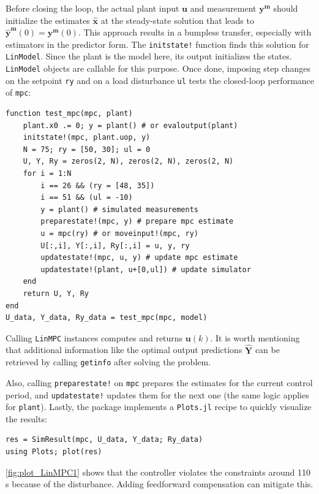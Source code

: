 Before closing the loop, the actual plant input $\mathbf{u}$ and measurement $\mathbf{y^m}$ should initialize the estimates $\mathbf{\hat{x}}$ at the steady-state solution that leads to $\mathbf{\hat{y}^m}(0)=\mathbf{y^m}(0)$. This approach results in a bumpless transfer, especially with estimators in the predictor form. The \texttt{initstate!} function finds this solution for \texttt{LinModel}. Since the plant is the model here, its output initializes the states. \texttt{LinModel} objects are callable for this purpose. Once done, imposing step changes on the setpoint \texttt{ry} and on a load disturbance \texttt{ul} tests the closed-loop performance of \texttt{mpc}:
\begin{verbatim}
function test_mpc(mpc, plant)
    plant.x0 .= 0; y = plant() # or evaloutput(plant)
    initstate!(mpc, plant.uop, y)
    N = 75; ry = [50, 30]; ul = 0
    U, Y, Ry = zeros(2, N), zeros(2, N), zeros(2, N)
    for i = 1:N
        i == 26 && (ry = [48, 35])
        i == 51 && (ul = -10)
        y = plant() # simulated measurements
        preparestate!(mpc, y) # prepare mpc estimate
        u = mpc(ry) # or moveinput!(mpc, ry)
        U[:,i], Y[:,i], Ry[:,i] = u, y, ry
        updatestate!(mpc, u, y) # update mpc estimate
        updatestate!(plant, u+[0,ul]) # update simulator
    end
    return U, Y, Ry
end
U_data, Y_data, Ry_data = test_mpc(mpc, model)
\end{verbatim}
Calling \texttt{LinMPC} instances computes and returns $\mathbf{u}(k)$. It is worth mentioning that additional information like the optimal output predictions $\mathbf{\hat{Y}}$ can be retrieved by calling \texttt{getinfo} after solving the problem. 

Also, calling \texttt{preparestate!} on \texttt{mpc} prepares the estimates for the current control period, and \texttt{updatestate!} updates them for the next one (the same logic applies for \texttt{plant}). Lastly, the package implements a \texttt{Plots.jl} recipe \citep{plots} to quickly visualize the results:
\begin{verbatim}
res = SimResult(mpc, U_data, Y_data; Ry_data)
using Plots; plot(res)
\end{verbatim}
\cref{fig:plot_LinMPC1} shows that the controller violates the constraints around 110 s because of the disturbance. Adding feedforward compensation can mitigate this.

